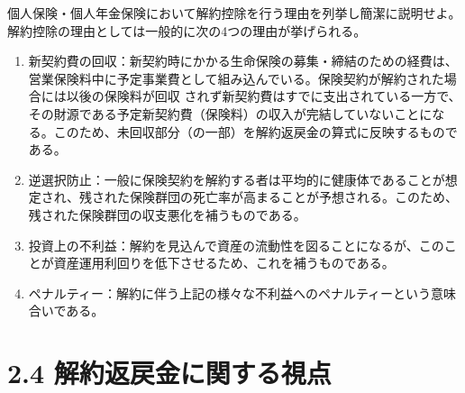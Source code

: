 \documentclass[report,gutter=10mm,fore-edge=10mm,uplatex,dvipdfmx]{jlreq}
\begin{document}
個人保険・個人年金保険において解約控除を行う理由を列挙し簡潔に説明せよ。
解約控除の理由としては一般的に次の4つの理由が挙げられる。
\begin{enumerate}
\item 新契約費の回収：新契約時にかかる生命保険の募集・締結のための経費は、営業保険料中に予定事業費として組み込んでいる。保険契約が解約された場合には以後の保険料が回収
  されず新契約費はすでに支出されている一方で、その財源である予定新契約費（保険料）の収入が完結していないことになる。このため、未回収部分（の一部）を解約返戻金の算式に反映するものである。
\item 逆選択防止：一般に保険契約を解約する者は平均的に健康体であることが想定され、残された保険群団の死亡率が高まることが予想される。このため、残された保険群団の収支悪化を補うものである。
\item 投資上の不利益：解約を見込んで資産の流動性を図ることになるが、このことが資産運用利回りを低下させるため、これを補うものである。
\item ペナルティー：解約に伴う上記の様々な不利益へのペナルティーという意味合いである。
\end{enumerate}

\section{2.4 解約返戻金に関する視点}
\end{document}
